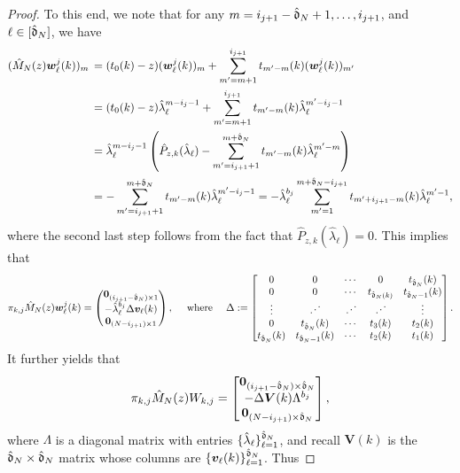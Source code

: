 \documentclass{amsart}
\numberwithin{equation}{section}
\begin{document}
\begin{proof}
To this end, we note that for any $m=i_{j+1}-\hat{\mathfrak{d}}_N+1,\ldots,i_{j+1}$, and $\ell \in [\hat{\mathfrak{d}}_N]$, we have
\begin{align*}
(\hat{M}_{N}(z) {\bm w}_\ell^j(k))_m &\, = (t_0(k)-z) ({\bm w}_\ell^j(k))_m + \sum_{m'=m+1}^{i_{j+1}} t_{m'-m}(k)({\bm w}_{\ell}^j(k))_{m'} \\
& \, = (t_0(k)-z) \hat{\lambda}_\ell^{m-i_j-1} + \sum_{m'=m+1}^{i_{j+1}} t_{m'-m}(k)\hat{\lambda}_{\ell}^{m'-i_j-1} \\
& \, = \hat{\lambda}_\ell^{m-i_j-1}\left( \hat{P}_{z,k}(\hat{\lambda}_\ell) - \sum_{m'=i_{j+1}+1}^{m+\hat{\mathfrak{d}}_N} t_{m'-m}(k)\hat{\lambda}_{\ell}^{m'-m}\right)\\
& \, = - \sum_{m'=i_{j+1}+1}^{m+\hat{\mathfrak{d}}_N} t_{m'-m}(k)\hat{\lambda}_{\ell}^{m'-i_j-1}= -\hat{\lambda}_\ell^{b_j} \sum_{m'=1}^{m+\hat{\mathfrak{d}}_N-i_{j+1}} t_{m'+i_{j+1}-m}(k)\hat{\lambda}_\ell^{m'-1},
\end{align*}
where the second last step follows from the fact that $\hat{P}_{z,k}(\hat{\lambda}_\ell)=0$. This implies that
\[
 \pi_{k,j}\hat{M}_{N}(z) {\bm w}_\ell^j(k)= \begin{pmatrix} {\bm 0}_{(i_{j+1}-\hat{\mathfrak{d}}_N) \times 1} \\ -\hat{\lambda}_\ell^{b_j} \Delta {\bm v}_\ell(k)\\ {\bm 0}_{(N-i_{j+1}) \times 1} \end{pmatrix}, \quad \text{ where } \quad \Delta:= \begin{bmatrix} 0 & 0 & \cdots & 0 & t_{\hat{\mathfrak{d}}_N}(k) \\ 0 & 0 & \cdots& t_{\hat{\mathfrak{d}}_N(k)} & t_{\hat{\mathfrak{d}}_N-1}(k)\\
\vdots & \iddots & \iddots & \iddots & \vdots \\ 0& t_{\hat{\mathfrak{d}}_N}(k)& \cdots&  t_3(k)& t_2(k)\\ t_{\hat{\mathfrak{d}}_N}(k)& t_{\hat{\mathfrak{d}}_N-1}(k)& \cdots&  t_2(k)& t_1(k)\end{bmatrix}.
 \]
 It further yields that
 \[
 \pi_{k,j}\hat{M}_N(z)W_{k,j}= \begin{bmatrix} {\bm 0}_{(i_{j+1}-\hat{\mathfrak{d}}_N) \times \hat{\mathfrak{d}}_N} \\ - \Delta {\bm V}(k) \Lambda^{b_j}\\ {\bm 0}_{(N-i_{j+1}) \times \hat{\mathfrak{d}}_N} \end{bmatrix},
 \]
 where $\Lambda$ is a diagonal matrix with entries $\{\hat{\lambda}_\ell\}_{\ell=1}^{\hat{\mathfrak{d}}_N}$, and recall ${\bm V}(k)$ is the $\hat{\mathfrak{d}}_N \times \hat{\mathfrak{d}}_N$ matrix whose columns are $\{{\bm v}_\ell(k) \}_{\ell=1}^{\hat{\mathfrak{d}}_N}$. Thus

\end{proof}
\end{document}
